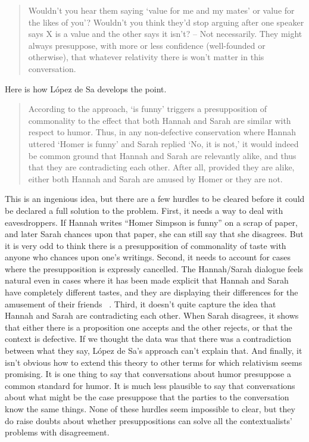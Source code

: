 \begin{quote}

Wouldn't you hear them saying `value for me and my mates' or value for the likes of you'? Wouldn't you think they'd stop arguing after one speaker says X is a value and the other says it isn't? – Not necessarily. They might always presuppose, with more or less confidence (well-founded or otherwise), that whatever relativity there is won't matter in this conversation. ~\citep[84]{Lewis1989b}
\end{quote}
Here is how López de Sa develops the point.

\begin{quote}

According to the approach, `is funny' triggers a presupposition of commonality to the effect that both Hannah and Sarah are similar with respect to humor. Thus, in any non-defective conservation where Hannah uttered `Homer is funny' and Sarah replied `No, it is not,' it would indeed be common ground that Hannah and Sarah are relevantly alike, and thus that they are contradicting each other. After all, provided they are alike, either both Hannah and Sarah are amused by Homer or they are not. ~\citep[305]{LopezDeSa2008b}
\end{quote}
This is an ingenious idea, but there are a few hurdles to be cleared before it could be declared a full solution to the problem. First, it needs a way to deal with eavesdroppers. If Hannah writes ``Homer Simpson is funny'' on a scrap of paper, and later Sarah chances upon that paper, she can still say that she disagrees. But it is very odd to think there is a presupposition of commonality of taste with anyone who chances upon one's writings. Second, it needs to account for cases where the presupposition is expressly cancelled. The Hannah\slash Sarah dialogue feels natural even in cases where it has been made explicit that Hannah and Sarah have completely different tastes, and they are displaying their differences for the amusement of their friends ~\citep[131--2]{MacFarlane2014}. Third, it doesn't quite capture the idea that Hannah and Sarah are contradicting each other. When Sarah disagrees, it shows that either there is a proposition one accepts and the other rejects, or that the context is defective. If we thought the data was that there was a contradiction between what they say, López de Sa's approach can't explain that. And finally, it isn't obvious how to extend this theory to other terms for which relativism seems promising. It is one thing to say that conversations about humor presuppose a common standard for humor. It is much less plausible to say that conversations about what might be the case presuppose that the parties to the conversation know the same things. None of these hurdles seem impossible to clear, but they do raise doubts about whether presuppositions can solve all the contextualists' problems with disagreement.

